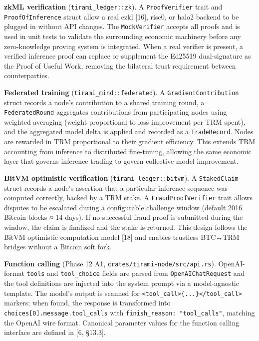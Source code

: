 \documentclass[
  11pt,
]{article}
\begin{document}
\textbf{zkML verification} (\texttt{tirami\_ledger::zk}). A
\texttt{ProofVerifier} trait and \texttt{ProofOfInference} struct allow
a real ezkl {[}16{]}, risc0, or halo2 backend to be plugged in without
API changes. The \texttt{MockVerifier} accepts all proofs and is used in
unit tests to validate the surrounding economic machinery before any
zero-knowledge proving system is integrated. When a real verifier is
present, a verified inference proof can replace or supplement the
Ed25519 dual-signature as the Proof of Useful Work, removing the
bilateral trust requirement between counterparties.

\textbf{Federated training} (\texttt{tirami\_mind::federated}). A
\texttt{GradientContribution} struct records a node's contribution to a
shared training round, a \texttt{FederatedRound} aggregates
contributions from participating nodes using weighted averaging (weight
proportional to loss improvement per TRM spent), and the aggregated
model delta is applied and recorded as a \texttt{TradeRecord}. Nodes are
rewarded in TRM proportional to their gradient efficiency. This extends
TRM accounting from inference to distributed fine-tuning, allowing the
same economic layer that governs inference trading to govern collective
model improvement.

\textbf{BitVM optimistic verification} (\texttt{tirami\_ledger::bitvm}).
A \texttt{StakedClaim} struct records a node's assertion that a
particular inference sequence was computed correctly, backed by a TRM
stake. A \texttt{FraudProofVerifier} trait allows disputes to be
escalated during a configurable challenge window (default 2016 Bitcoin
blocks ≈ 14 days). If no successful fraud proof is submitted during the
window, the claim is finalized and the stake is returned. This design
follows the BitVM optimistic computation model {[}18{]} and enables
trustless BTC↔TRM bridges without a Bitcoin soft fork.

\textbf{Function calling} (Phase 12 A1,
\texttt{crates/tirami-node/src/api.rs}). OpenAI-format \texttt{tools}
and \texttt{tool\_choice} fields are parsed from
\texttt{OpenAIChatRequest} and the tool definitions are injected into
the system prompt via a model-agnostic template. The model's output is
scanned for
\texttt{\textless{}tool\_call\textgreater{}\{...\}\textless{}/tool\_call\textgreater{}}
markers; when found, the response is transformed into
\texttt{choices{[}0{]}.message.tool\_calls} with
\texttt{finish\_reason:\ "tool\_calls"}, matching the OpenAI wire
format. Canonical parameter values for the function calling interface
are defined in {[}6, §13.3{]}.
\end{document}
